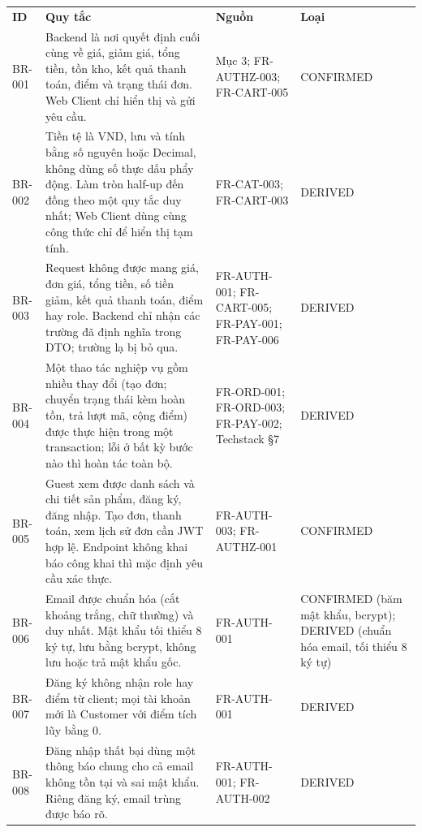 \documentclass[11pt,a4paper,oneside]{report}
\begin{document}
\begin{longtable}[]{@{}
  >{\raggedright\arraybackslash}p{}
  >{\raggedright\arraybackslash}p{}
  >{\raggedright\arraybackslash}p{}
  >{\raggedright\arraybackslash}p{}@{}}
\toprule\noalign{}
\endhead
\bottomrule\noalign{}
\endlastfoot
\textbf{ID} & \textbf{Quy tắc} & \textbf{Nguồn} & \textbf{Loại} \\
BR-001 & Backend là nơi quyết định cuối cùng về giá, giảm giá, tổng tiền, tồn kho, kết quả thanh toán, điểm và trạng thái đơn. Web Client chỉ hiển thị và gửi yêu cầu. & Mục 3; FR-AUTHZ-003; FR-CART-005 & CONFIRMED \\
BR-002 & Tiền tệ là VND, lưu và tính bằng số nguyên hoặc Decimal, không dùng số thực dấu phẩy động. Làm tròn half-up đến đồng theo một quy tắc duy nhất; Web Client dùng cùng công thức chỉ để hiển thị tạm tính. & FR-CAT-003; FR-CART-003 & DERIVED \\
BR-003 & Request không được mang giá, đơn giá, tổng tiền, số tiền giảm, kết quả thanh toán, điểm hay role. Backend chỉ nhận các trường đã định nghĩa trong DTO; trường lạ bị bỏ qua. & FR-AUTH-001; FR-CART-005; FR-PAY-001; FR-PAY-006 & DERIVED \\
BR-004 & Một thao tác nghiệp vụ gồm nhiều thay đổi (tạo đơn; chuyển trạng thái kèm hoàn tồn, trả lượt mã, cộng điểm) được thực hiện trong một transaction; lỗi ở bất kỳ bước nào thì hoàn tác toàn bộ. & FR-ORD-001; FR-ORD-003; FR-PAY-002; Techstack §7 & DERIVED \\
BR-005 & Guest xem được danh sách và chi tiết sản phẩm, đăng ký, đăng nhập. Tạo đơn, thanh toán, xem lịch sử đơn cần JWT hợp lệ. Endpoint không khai báo công khai thì mặc định yêu cầu xác thực. & FR-AUTH-003; FR-AUTHZ-001 & CONFIRMED \\
BR-006 & Email được chuẩn hóa (cắt khoảng trắng, chữ thường) và duy nhất. Mật khẩu tối thiểu 8 ký tự, lưu bằng bcrypt, không lưu hoặc trả mật khẩu gốc. & FR-AUTH-001 & CONFIRMED (băm mật khẩu, bcrypt); DERIVED (chuẩn hóa email, tối thiểu 8 ký tự) \\
BR-007 & Đăng ký không nhận role hay điểm từ client; mọi tài khoản mới là Customer với điểm tích lũy bằng 0. & FR-AUTH-001 & DERIVED \\
BR-008 & Đăng nhập thất bại dùng một thông báo chung cho cả email không tồn tại và sai mật khẩu. Riêng đăng ký, email trùng được báo rõ. & FR-AUTH-001; FR-AUTH-002 & DERIVED \\

\end{longtable}
\end{document}
